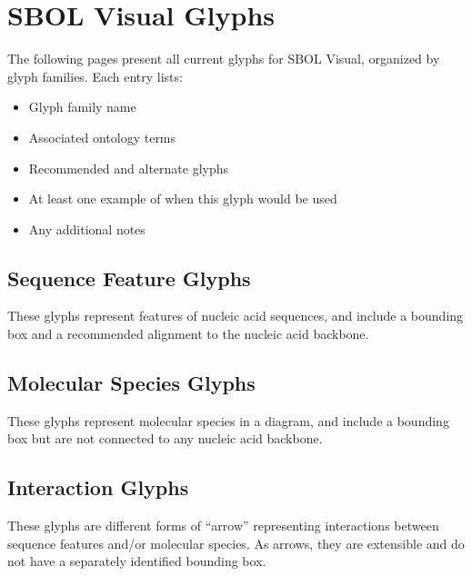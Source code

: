 \section{SBOL Visual Glyphs}\label{apdx:symbols}

The following pages present all current glyphs for SBOL Visual, organized by glyph families.
Each entry lists:
\begin{itemize}
\item Glyph family name
\item Associated ontology terms
\item Recommended and alternate glyphs
\item At least one example of when this glyph would be used
\item Any additional notes
\end{itemize}

\subsection{Sequence Feature Glyphs}\label{apdx:sym:feature}

These glyphs represent features of nucleic acid sequences, and include a bounding box and a recommended alignment to the nucleic acid backbone.




\subsection{Molecular Species Glyphs}\label{apdx:sym:species}

These glyphs represent molecular species in a diagram, and include a bounding box but are not connected to any nucleic acid backbone.




\subsection{Interaction Glyphs}\label{apdx:sym:interaction}

These glyphs are different forms of ``arrow'' representing interactions between sequence features and/or molecular species. As arrows, they are extensible and do not have a separately identified bounding box.


